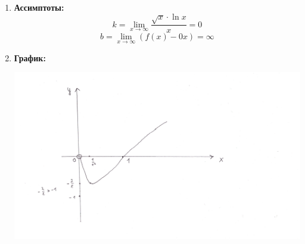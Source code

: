 \documentclass[a4paper,12pt]{article}
\begin{document}
\begin{enumerate}
\begin{center}
\end{center} 
\item \textbf{Ассимптоты:}
\[
k = \lim_{x \rightarrow \infty} \frac{\sqrt{x} \cdot \ln x}{x} = 0
\]
\[
b = \lim_{x \rightarrow \infty} (f(x) - 0x) = \infty
\]
\item \textbf{График:}
\begin{center}
\includegraphics[scale=0.7]{grah3.png}
\end{center}
\end{enumerate}
\newpage
\end{document}
